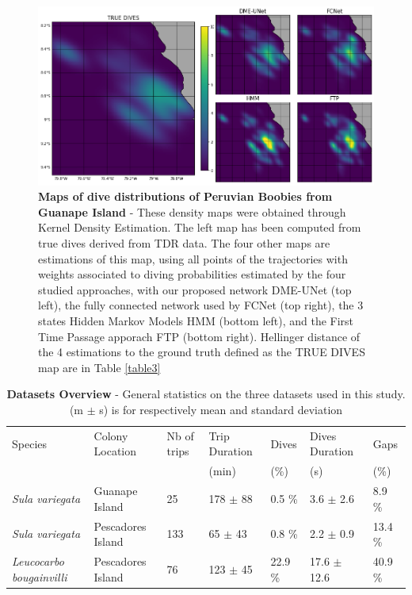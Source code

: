 \documentclass{article}
\begin{document}
\begin{figure}[h]
  \centering
  \includegraphics[scale=0.5]{figure5.png}
  \caption{\textbf{Maps of dive distributions of Peruvian Boobies from Guanape Island} - These density maps were obtained through Kernel Density Estimation. The left map has been computed from true dives derived from TDR data. The four other maps are estimations of this map, using  all points of the trajectories with weights associated to diving probabilities estimated by the four studied approaches,  with our proposed network DME-UNet (top left), the fully connected network used by \cite{browning_predicting_2018}  FCNet (top right), the 3 states Hidden Markov Models HMM (bottom left), and the First Time Passage apporach FTP (bottom right). Hellinger distance of the 4 estimations to the ground truth defined as the TRUE DIVES map are in Table \ref{table3}}
  \label{figure5}
\end{figure}

\begin{table}[h]
 \caption{\textbf{Datasets Overview} - General statistics on the three datasets used in this study. (m $\pm$ s) is for respectively mean and standard deviation}
  \centering
  \begin{tabular}{lllllll}
    \toprule
    Species  &  Colony Location & Nb of trips  & Trip Duration & Dives  & Dives Duration & Gaps \\
      &    &     & (min) & (\%) & (s) & (\%) \\
    \midrule
    \textit{Sula variegata}         & Guanape Island    & 25   & 178 $\pm$ 88  & 0.5 \%  & 3.6 $\pm$ 2.6 & 8.9 \% \\
    \textit{Sula variegata}         & Pescadores Island & 133 & 65 $\pm$ 43  & 0.8 \%  & 2.2 $\pm$ 0.9  & 13.4 \% \\
    \textit{Leucocarbo bougainvilli}& Pescadores Island & 76   & 123 $\pm$ 45  & 22.9 \%  & 17.6 $\pm$ 12.6 & 40.9 \% \\
    \bottomrule
  \end{tabular}
  \label{table1}
\end{table}
\end{document}
